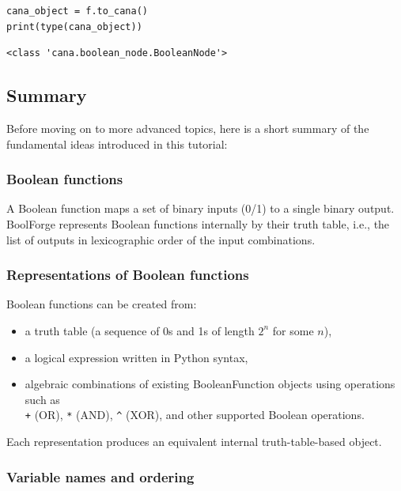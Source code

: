 \documentclass[
]{article}
\providecommand{\tightlist}{%
  \setlength{\itemsep}{0pt}\setlength{\parskip}{0pt}}
\begin{document}
\begin{lstlisting}
cana_object = f.to_cana()
print(type(cana_object))
\end{lstlisting}

\begin{lstlisting}
<class 'cana.boolean_node.BooleanNode'>
\end{lstlisting}

\subsection{Summary}\label{summary}

Before moving on to more advanced topics, here is a short summary of the
fundamental ideas introduced in this tutorial:

\subsubsection{Boolean functions}\label{boolean-functions}

A Boolean function maps a set of binary inputs (0/1) to a single binary
output. BoolForge represents Boolean functions internally by their truth
table, i.e., the list of outputs in lexicographic order of the input
combinations.

\subsubsection{Representations of Boolean
functions}\label{representations-of-boolean-functions}

Boolean functions can be created from:

\begin{itemize}
\tightlist
\item
  a truth table (a sequence of 0s and 1s of length \(2^n\) for some
  \(n\)),
\item
  a logical expression written in Python syntax,
\item
  algebraic combinations of existing BooleanFunction objects using
  operations such as\\
  \texttt{+} (OR), \texttt{*} (AND), \texttt{\^{}} (XOR), and other
  supported Boolean operations.
\end{itemize}

Each representation produces an equivalent internal truth-table-based
object.

\subsubsection{Variable names and
ordering}\label{variable-names-and-ordering}
\end{document}
